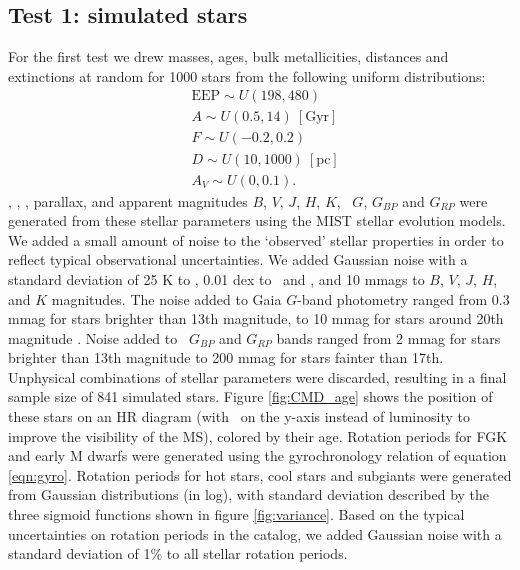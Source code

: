 \subsection{Test 1: simulated stars}
For the first test we drew masses, ages, bulk metallicities, distances and
extinctions at random for 1000 stars from the following uniform distributions:
\begin{eqnarray}
& \mathrm{EEP} \sim U(198, 480) \\
& A \sim U(0.5, 14)\mathrm{~[Gyr]} \\
& F \sim U(-0.2, 0.2) \\
& D \sim U(10, 1000)~\mathrm{[pc]} \\
& A_V \sim U(0, 0.1).
\end{eqnarray}
\teff, \logg, \fhat, parallax, and apparent magnitudes $B$, $V$, $J$, $H$, $K$,
\gaia\ $G$, $G_{BP}$ and $G_{RP}$ were generated from these
stellar parameters using the MIST stellar evolution models.
We added a small amount of noise to the `observed' stellar properties in order
to reflect typical observational uncertainties.
We added Gaussian noise with a standard deviation of 25 K to \teff, 0.01 dex
to \feh\ and \logg, and 10 mmags to $B$, $V$, $J$, $H$, and $K$ magnitudes.
The noise added to Gaia $G$-band photometry ranged from
0.3 mmag for stars brighter than 13th magnitude, to 10 mmag for stars
around 20th magnitude \citep{evans2017, brown2018}.
Noise added to \gaia\ $G_{BP}$ and $G_{RP}$ bands ranged from 2 mmag for stars
brighter than 13th magnitude to 200 mmag for stars fainter than 17th.
Unphysical combinations of stellar parameters were discarded, resulting in a
final sample size of 841 simulated stars.
Figure \ref{fig:CMD_age} shows the position of these stars on an HR diagram
(with \logg\ on the y-axis instead of luminosity to improve the visibility of
the MS), colored by their age.
Rotation periods for FGK and early M dwarfs were generated using the
gyrochronology relation of equation \ref{eqn:gyro}.
Rotation periods for hot stars, cool stars and subgiants were generated from
Gaussian distributions (in log), with standard deviation described by the
three sigmoid functions shown in figure \ref{fig:variance}.
Based on the typical uncertainties on rotation periods in the
\citet{mcquillan2014} catalog, we added Gaussian noise with a standard
deviation of 1\% to all stellar rotation periods.
